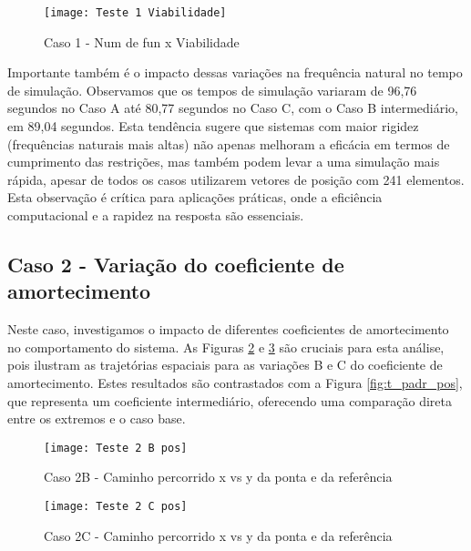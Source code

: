 \begin{figure}[H]
    \begin{center}
    \caption{Caso 1 - Num de fun x Viabilidade}
    \texttt{[image: Teste 1 Viabilidade]}
    \label{fig:t_1_viab}
    \end{center}
\end{figure}

Importante também é o impacto dessas variações na frequência natural no tempo de simulação. Observamos que os tempos de simulação variaram de 96,76 segundos no Caso A até 80,77 segundos no Caso C, com o Caso B intermediário, em 89,04 segundos. Esta tendência sugere que sistemas com maior rigidez (frequências naturais mais altas) não apenas melhoram a eficácia em termos de cumprimento das restrições, mas também podem levar a uma simulação mais rápida, apesar de todos os casos utilizarem vetores de posição com 241 elementos. Esta observação é crítica para aplicações práticas, onde a eficiência computacional e a rapidez na resposta são essenciais.

\subsection{Caso 2 - Variação do coeficiente de amortecimento}
Neste caso, investigamos o impacto de diferentes coeficientes de amortecimento no comportamento do sistema. As Figuras \ref{fig:t_2b_pos} e \ref{fig:t_2c_pos} são cruciais para esta análise, pois ilustram as trajetórias espaciais para as variações B e C do coeficiente de amortecimento. Estes resultados são contrastados com a Figura \ref{fig:t_padr_pos}, que representa um coeficiente intermediário, oferecendo uma comparação direta entre os extremos e o caso base.

\begin{figure}[H]
    \begin{center}
    \caption{Caso 2B - Caminho percorrido x vs y da ponta e da referência}
    \texttt{[image: Teste 2 B pos]}
    \label{fig:t_2b_pos}
    \end{center}
\end{figure}

\begin{figure}[H]
    \begin{center}
    \caption{Caso 2C - Caminho percorrido x vs y da ponta e da referência}
    \texttt{[image: Teste 2 C pos]}
    \label{fig:t_2c_pos}
    \end{center}
\end{figure}

